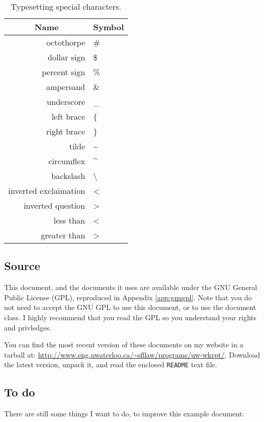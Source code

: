 \documentclass{uw-wkrpt}
\begin{document}
\begin{table}
  \caption{Typesetting special characters.}
  \label{tbl:chars}
  \centering
  \begin{tabular}{|r|l|}
    \hline
    \multicolumn{1}{|c|}{\textbf{Name}} &
    \multicolumn{1}{|c|}{\textbf{Symbol}} \\
    \hline\hline
    octothorpe   & \# \\
    dollar sign  & \$ \\
    percent sign & \% \\
    ampersand    & \& \\
    underscore   & \_ \\
    left brace   & \{ \\
    right brace  & \} \\
    tilde        & \textasciitilde  \\
    circumflex   & \textasciicircum \\
    backslash    & \textbackslash   \\
    \hline
    inverted exclaimation & < \\
    inverted question     & > \\
    less than    & \textless \\
    greater than & \textgreater \\
    \hline
  \end{tabular}
\end{table}

\subsection{Source}

This document, and the documents it uses are available under the
GNU General Public License (GPL), reproduced in Appendix \ref{app:gnugpl}.
Note that you do not need to accept the GNU GPL to use this document, or
to use the document class.  I highly recommend that you read the GPL so
you understand your rights and privledges.

You can find the most recent version of these documents on my website
in a tarball at: \url{http://www.eng.uwaterloo.ca/~sfllaw/programs/uw-wkrpt/}.
Download the latest version, unpack it, and read the enclosed \texttt{README}
text file.

\subsection{To do}
There are still some things I want to do, to improve this example
document:
\end{document}
